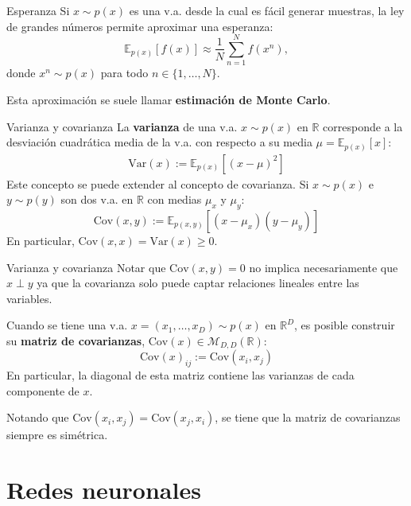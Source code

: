 \documentclass{beamer}
\newcommand{\R}{\mathbb{R}}
\begin{document}
\begin{frame}{Esperanza}
    Si $x\sim p(x)$ es una v.a. desde la cual es fácil generar muestras, la ley de grandes números permite aproximar una esperanza:
    \begin{equation*}
        \mathbb{E}_{p(x)}[f(x)]\approx \frac{1}{N}\sum_{n=1}^N f(x^n),
    \end{equation*}
    donde $x^n\sim p(x)$ para todo $n\in\{1,\ldots,N\}$.

    Esta aproximación se suele llamar \textbf{estimación de Monte Carlo}.
\end{frame}

\begin{frame}{Varianza y covarianza}
    La \textbf{varianza} de una v.a. $x\sim p(x)$ en $\R$ corresponde a la desviación cuadrática media de la v.a. con respecto a su media $\mu=\mathbb{E}_{p(x)}\left[x\right]$:
    \begin{align*}
        \text{Var}(x):=\mathbb{E}_{p(x)}\left[(x-\mu)^2\right]
    \end{align*}
    Este concepto se puede extender al concepto de covarianza. Si $x\sim p(x)$ e $y\sim p(y)$ son dos v.a. en $\R$ con medias $\mu_x$ y $\mu_y$:
    \begin{equation*}
        \text{Cov}(x,y):=\mathbb{E}_{p(x,y)}\left[(x-\mu_x)(y-\mu_y)\right]
    \end{equation*}
    En particular, $\text{Cov}(x,x)=\text{Var}(x)\geq 0$.
\end{frame}

\begin{frame}{Varianza y covarianza}
    Notar que $\text{Cov}(x,y)=0$ no implica necesariamente que $x\perp y$ ya que la covarianza solo puede captar relaciones lineales entre las variables.

    Cuando se tiene una v.a. $x=(x_1,\ldots,x_D)\sim p(x)$ en $\R^D$, es posible construir su \textbf{matriz de covarianzas}, $\text{Cov}(x)\in\mathcal{M}_{D,D}(\R)$:
    \begin{equation*}
        \text{Cov}(x)_{ij}:=\text{Cov}(x_i,x_j)
    \end{equation*}
    En particular, la diagonal de esta matriz contiene las varianzas de cada componente de $x$.

    Notando que $\text{Cov}(x_i,x_j)=\text{Cov}(x_j,x_i)$, se tiene que la matriz de covarianzas siempre es simétrica.
\end{frame}

\section{Redes neuronales}
\end{document}
